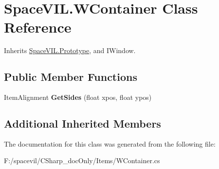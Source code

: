 \hypertarget{class_space_v_i_l_1_1_w_container}{}\section{Space\+V\+I\+L.\+W\+Container Class Reference}
\label{class_space_v_i_l_1_1_w_container}


Inherits \mbox{\hyperlink{class_space_v_i_l_1_1_prototype}{Space\+V\+I\+L.\+Prototype}}, and I\+Window.

\subsection*{Public Member Functions}
\begin{DoxyCompactItemize}
\item 
\mbox{\label{class_space_v_i_l_1_1_w_container_ac1f0ab7e9f515147a1aa62d8bc0de897}} 
Item\+Alignment {\bfseries Get\+Sides} (float xpos, float ypos)
\end{DoxyCompactItemize}
\subsection*{Additional Inherited Members}


The documentation for this class was generated from the following file\+:\begin{DoxyCompactItemize}
\item 
F\+:/spacevil/\+C\+Sharp\+\_\+doc\+Only/\+Items/W\+Container.\+cs\end{DoxyCompactItemize}
